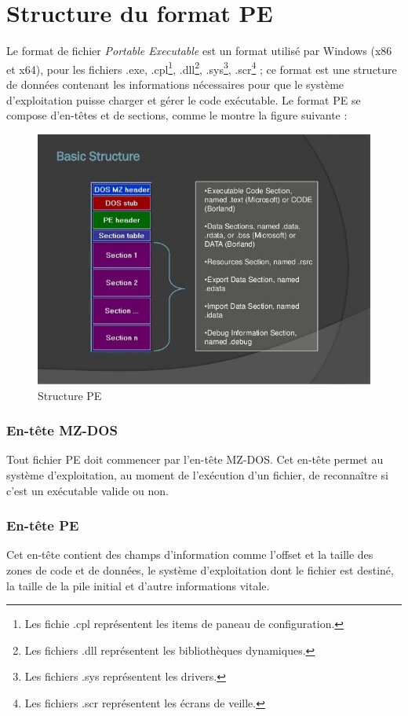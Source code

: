\section{Structure du format PE} \label{pe_header}
Le format de fichier \emph{Portable Executable} \cite{pe1} est un format utilisé par Windows (x86 et x64), 
pour les fichiers .exe, .cpl\footnote{Les fichie .cpl représentent les items de paneau de configuration.}, 
.dll\footnote{Les fichiers .dll représentent les bibliothèques dynamiques.}, 
.sys\footnote{Les fichiers .sys représentent les drivers.}, 
.scr\footnote{Les fichiers .scr représentent les écrans de veille.} ;
ce format est une structure de données contenant les 
informations nécessaires pour que le système d’exploitation puisse charger et gérer le code 
exécutable.  Le format PE se compose d'en-têtes et de sections, comme le montre la figure suivante :
\begin{figure}[h]
    \centering
    \includegraphics[scale=0.5]{images/pe_header.jpg}
    \caption{Structure PE}
    \label{structure_pe}
\end{figure}

    \subsubsection{En-tête MZ-DOS}
    Tout fichier PE doit commencer par l'en-tête MZ-DOS. Cet en-tête permet au système d'exploitation, au 
    moment de l'exécution d'un fichier, de reconnaître si c'est un exécutable valide ou non. \cite{pe2}

    \subsubsection{En-tête PE}
    Cet en-tête contient des champs d'information comme l'offset et la taille des zones de code et de données, 
    le système d'exploitation dont le fichier est destiné, la taille de la pile initial et 
    d'autre informations vitale. \cite{pe3}

